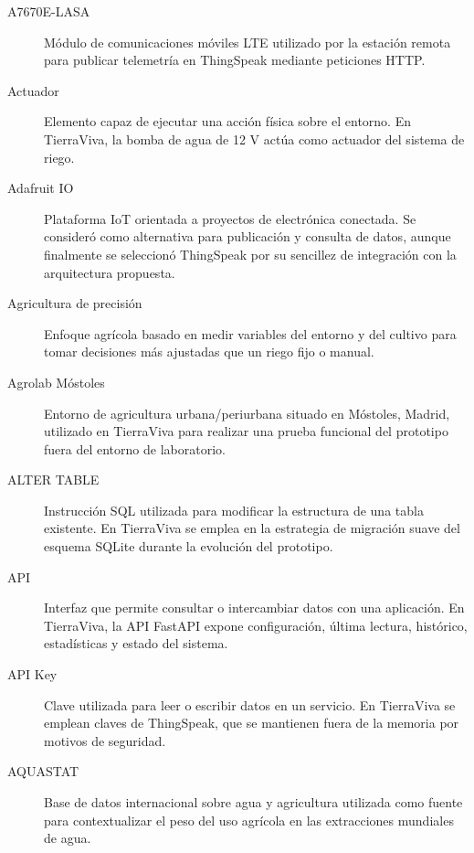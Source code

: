 \begin{description}

    \item[A7670E-LASA]
    Módulo de comunicaciones móviles LTE utilizado por la estación remota para publicar telemetría en ThingSpeak mediante peticiones HTTP.

    \item[Actuador]
    Elemento capaz de ejecutar una acción física sobre el entorno. En TierraViva, la bomba de agua de 12 V actúa como actuador del sistema de riego.

    \item[Adafruit IO]
    Plataforma IoT orientada a proyectos de electrónica conectada. Se consideró como alternativa para publicación y consulta de datos, aunque finalmente se seleccionó ThingSpeak por su sencillez de integración con la arquitectura propuesta.

    \item[Agricultura de precisión]
    Enfoque agrícola basado en medir variables del entorno y del cultivo para tomar decisiones más ajustadas que un riego fijo o manual.

    \item[Agrolab Móstoles]
    Entorno de agricultura urbana/periurbana situado en Móstoles, Madrid, utilizado en TierraViva para realizar una prueba funcional del prototipo fuera del entorno de laboratorio.

    \item[ALTER TABLE]
    Instrucción SQL utilizada para modificar la estructura de una tabla existente. En TierraViva se emplea en la estrategia de migración suave del esquema SQLite durante la evolución del prototipo.

    \item[API]
    Interfaz que permite consultar o intercambiar datos con una aplicación. En TierraViva, la API FastAPI expone configuración, última lectura, histórico, estadísticas y estado del sistema.

    \item[API Key]
    Clave utilizada para leer o escribir datos en un servicio. En TierraViva se emplean claves de ThingSpeak, que se mantienen fuera de la memoria por motivos de seguridad.

    \item[AQUASTAT]
    Base de datos internacional sobre agua y agricultura utilizada como fuente para contextualizar el peso del uso agrícola en las extracciones mundiales de agua.
    

\end{description}
